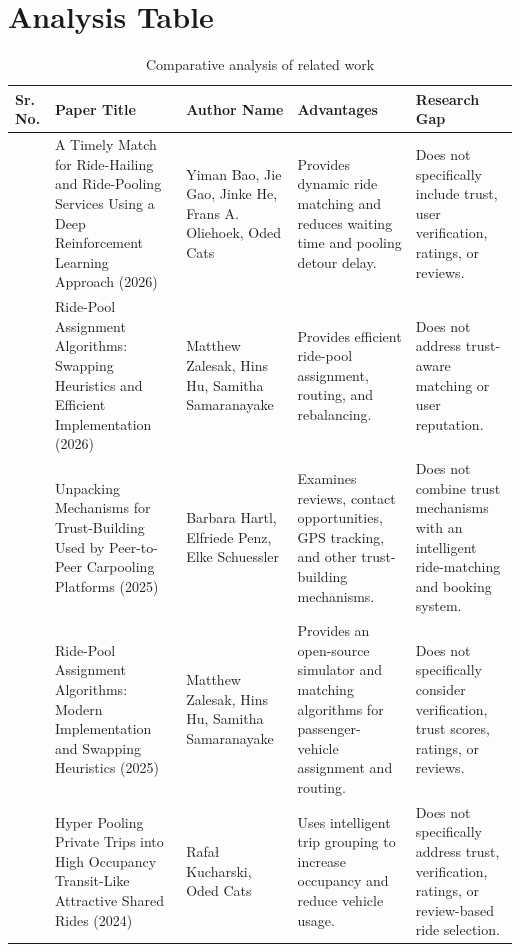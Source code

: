 \documentclass[12pt,a4paper,oneside]{report}
\begin{document}
\section{Analysis Table}
\small
\begin{longtable}{|>{\centering\arraybackslash}p{0.7cm}|p{3.6cm}|p{2.8cm}|p{4.1cm}|p{3.8cm}|}
\caption{Comparative analysis of related work}\label{tab:literature}\\
\hline
\textbf{Sr. No.} & \textbf{Paper Title} & \textbf{Author Name} & \textbf{Advantages} & \textbf{Research Gap}\\
\hline
\endfirsthead




\endfoot
\hline
\endlastfoot
1 & A Timely Match for Ride-Hailing and Ride-Pooling Services Using a Deep Reinforcement Learning Approach (2026) & Yiman Bao, Jie Gao, Jinke He, Frans A. Oliehoek, Oded Cats & Provides dynamic ride matching and reduces waiting time and pooling detour delay. & Does not specifically include trust, user verification, ratings, or reviews.\\ \hline
2 & Ride-Pool Assignment Algorithms: Swapping Heuristics and Efficient Implementation (2026) & Matthew Zalesak, Hins Hu, Samitha Samaranayake & Provides efficient ride-pool assignment, routing, and rebalancing. & Does not address trust-aware matching or user reputation.\\ \hline
3 & Unpacking Mechanisms for Trust-Building Used by Peer-to-Peer Carpooling Platforms (2025) & Barbara Hartl, Elfriede Penz, Elke Schuessler & Examines reviews, contact opportunities, GPS tracking, and other trust-building mechanisms. & Does not combine trust mechanisms with an intelligent ride-matching and booking system.\\ \hline
4 & Ride-Pool Assignment Algorithms: Modern Implementation and Swapping Heuristics (2025) & Matthew Zalesak, Hins Hu, Samitha Samaranayake & Provides an open-source simulator and matching algorithms for passenger-vehicle assignment and routing. & Does not specifically consider verification, trust scores, ratings, or reviews.\\ \hline
5 & Hyper Pooling Private Trips into High Occupancy Transit-Like Attractive Shared Rides (2024) & Rafa\l{} Kucharski, Oded Cats & Uses intelligent trip grouping to increase occupancy and reduce vehicle usage. & Does not specifically address trust, verification, ratings, or review-based ride selection.\\ 
\end{longtable}
\normalsize
\end{document}
